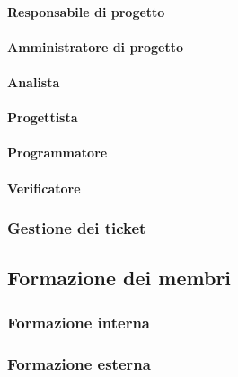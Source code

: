 \paragraph{Responsabile di progetto}
\paragraph{Amministratore di progetto}
\paragraph{Analista}
\paragraph{Progettista}
\paragraph{Programmatore}
\paragraph{Verificatore}
\subsubsection{Gestione dei ticket}

\subsection{Formazione dei membri}
\subsubsection{Formazione interna}
\subsubsection{Formazione esterna}
